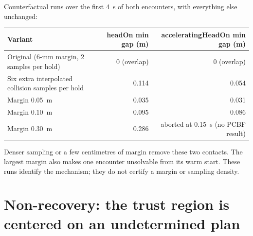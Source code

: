 \documentclass[11pt]{article}
\begin{document}
Counterfactual runs over the first 4~s of both encounters, with everything
else unchanged:
\begin{center}\footnotesize
\begin{tabular}{lrr}
\toprule
Variant & headOn min gap (m) & acceleratingHeadOn min gap (m)\\
\midrule
Original (6-mm margin, 2 samples per hold) & 0 (overlap) & 0 (overlap)\\
Six extra interpolated collision samples per hold & 0.114 & 0.054\\
Margin 0.05~m & 0.035 & 0.031\\
Margin 0.10~m & 0.095 & 0.086\\
Margin 0.30~m & 0.286 & aborted at 0.15~s (no PCBF result)\\
\bottomrule
\end{tabular}\end{center}
Denser sampling or a few centimetres of margin remove these two contacts. The
largest margin also makes one encounter unsolvable from its warm start. These
runs identify the mechanism; they do not certify a margin or sampling density.

\section{Non-recovery: the trust region is centered on an undetermined plan}
\end{document}
